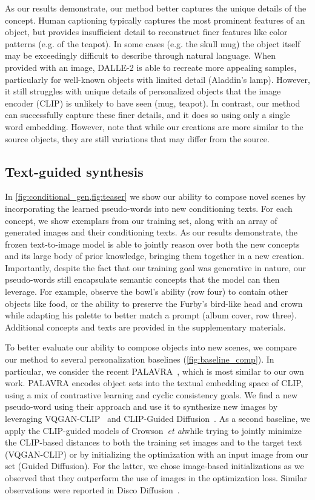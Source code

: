 As our results demonstrate, our method better captures the unique details of the concept. Human captioning typically captures the most prominent features of an object, but provides insufficient detail to reconstruct finer features like color patterns (e.g. of the teapot). In some cases (e.g. the skull mug) the object itself may be exceedingly difficult to describe through natural language. When provided with an image, DALLE-2 is able to recreate more appealing samples, particularly for well-known objects with limited detail (Aladdin's lamp). However, it still struggles with unique details of personalized objects that the image encoder (CLIP) is unlikely to have seen (mug, teapot). In contrast, our method can successfully capture these finer details, and it does so using only a single word embedding. However, note that while our creations are more similar to the source objects, they are still variations that may differ from the source.

\subsection{Text-guided synthesis}

In \ref{fig:conditional_gen,fig:teaser} we show our ability to compose novel scenes by incorporating the learned pseudo-words into new conditioning texts. For each concept, we show exemplars from our training set, along with an array of generated images and their conditioning texts. As our results demonstrate, the frozen text-to-image model is able to jointly reason over both the new concepts and its large body of prior knowledge, bringing them together in a new creation. Importantly, despite the fact that our training goal was generative in nature, our pseudo-words still encapsulate semantic concepts that the model can then leverage. For example, observe the bowl's ability (row four) to contain other objects like food, or the ability to preserve the Furby's bird-like head and crown while adapting his palette to better match a prompt (album cover, row three). Additional concepts and texts are provided in the supplementary materials.

To better evaluate our ability to compose objects into new scenes, we compare our method to several personalization baselines (\ref{fig:baseline_comp}). In particular, we consider the recent PALAVRA~\citep{cohen2022my}, which is most similar to our own work. PALAVRA encodes object sets into the textual embedding space of CLIP, using a mix of contrastive learning and cyclic consistency goals. We find a new pseudo-word using their approach and use it to synthesize new images by leveraging VQGAN-CLIP~\citep{crowson2022vqgan} and CLIP-Guided Diffusion~\citep{crowson2021diffusion}. As a second baseline, we apply the CLIP-guided models of Crowson~\emph{et al}\onedot while trying to jointly minimize the CLIP-based distances to both the training set images and to the target text (VQGAN-CLIP) or by initializing the optimization with an input image from our set (Guided Diffusion). For the latter, we chose image-based initializations as we observed that they outperform the use of images in the optimization loss. Similar observations were reported in Disco Diffusion~\citep{lettsDiscoDiffusion2021}.

